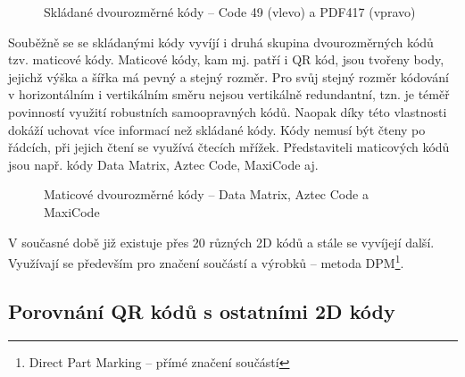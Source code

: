 \begin{figure}[H]
  \begin{center}
    \caption{Skládané dvourozměrné kódy -- Code 49 (vlevo) a PDF417 (vpravo)
    \cite{codeGenerator}}
    \label{stackedCodes}
  \end{center}
\end{figure}

Souběžně se se skládanými kódy vyvíjí i druhá skupina dvourozměrných kódů tzv. 
maticové kódy. Maticové kódy, kam mj. patří i QR kód, jsou tvořeny body, jejichž 
výška a šířka má pevný a stejný rozměr. Pro svůj stejný rozměr kódování 
v horizontálním i vertikálním směru nejsou vertikálně redundantní, tzn. je 
téměř povinností využití robustních samoopravných kódů. Naopak díky této 
vlastnosti dokáží uchovat více informací než skládané kódy. Kódy nemusí být 
čteny po řádcích, při jejich čtení se využívá čtecích mřížek. Představiteli 
maticových kódů jsou např. kódy Data Matrix, Aztec Code, MaxiCode aj.
\cite{automatizaceClanek}
             
\begin{figure}[H]
  \begin{center}
    \caption{Maticové dvourozměrné kódy -- Data Matrix, Aztec Code a MaxiCode
    \cite{codeGenerator}}
    \label{matrixCodes}
  \end{center}
\end{figure}              

V současné době již existuje přes 20 různých 2D kódů a stále se vyvíjejí další.
Využívají se především pro značení součástí a výrobků – metoda
DPM\footnote{Direct Part Marking -- přímé značení součástí}.
\cite{automatizaceClanek}


\subsection{Porovnání QR kódů s ostatními 2D kódy}
\label{porovnani2DKoduSQRKody}


